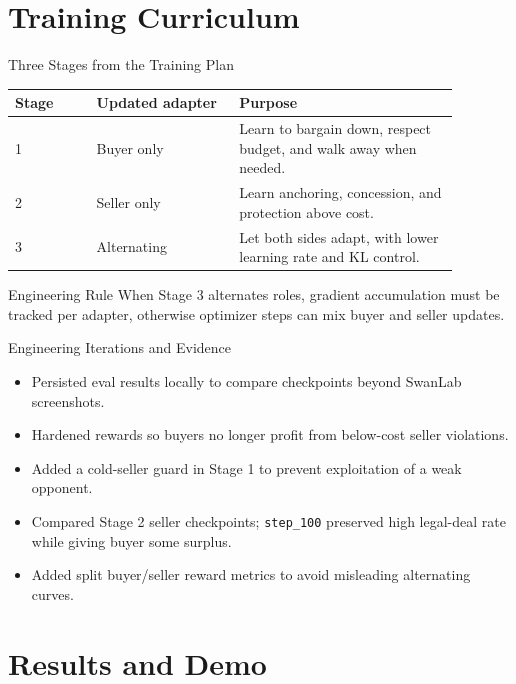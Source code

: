 \documentclass{beamer}
\begin{document}
\section{Training Curriculum}

\begin{frame}{Three Stages from the Training Plan}
\begin{table}
\centering
\small
\begin{tabular}{@{}p{0.16\linewidth}p{0.29\linewidth}p{0.43\linewidth}@{}}
\toprule
Stage & Updated adapter & Purpose\\
\midrule
1 & Buyer only & Learn to bargain down, respect budget, and walk away when needed.\\
2 & Seller only & Learn anchoring, concession, and protection above cost.\\
3 & Alternating & Let both sides adapt, with lower learning rate and KL control.\\
\bottomrule
\end{tabular}
\end{table}
\vspace{0.25cm}
\begin{block}{Engineering Rule}
When Stage 3 alternates roles, gradient accumulation must be tracked per
adapter, otherwise optimizer steps can mix buyer and seller updates.
\end{block}
\end{frame}

\begin{frame}{Engineering Iterations and Evidence}
\begin{itemize}
    \item Persisted eval results locally to compare checkpoints beyond SwanLab screenshots.
    \item Hardened rewards so buyers no longer profit from below-cost seller violations.
    \item Added a cold-seller guard in Stage 1 to prevent exploitation of a weak opponent.
    \item Compared Stage 2 seller checkpoints; \texttt{step\_100} preserved high legal-deal rate while giving buyer some surplus.
    \item Added split buyer/seller reward metrics to avoid misleading alternating curves.
\end{itemize}
\end{frame}

\section{Results and Demo}
\end{document}
